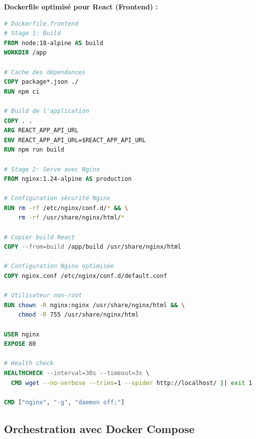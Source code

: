 \begin{exemple}
\textbf{Dockerfile optimisé pour React (Frontend) :}
\begin{lstlisting}[language=dockerfile]
# Dockerfile.frontend
# Stage 1: Build
FROM node:18-alpine AS build
WORKDIR /app

# Cache des dépendances
COPY package*.json ./
RUN npm ci

# Build de l'application
COPY . .
ARG REACT_APP_API_URL
ENV REACT_APP_API_URL=$REACT_APP_API_URL
RUN npm run build

# Stage 2: Serve avec Nginx
FROM nginx:1.24-alpine AS production

# Configuration sécurité Nginx
RUN rm -rf /etc/nginx/conf.d/* && \
    rm -rf /usr/share/nginx/html/*

# Copier build React
COPY --from=build /app/build /usr/share/nginx/html

# Configuration Nginx optimisée
COPY nginx.conf /etc/nginx/conf.d/default.conf

# Utilisateur non-root
RUN chown -R nginx:nginx /usr/share/nginx/html && \
    chmod -R 755 /usr/share/nginx/html

USER nginx
EXPOSE 80

# Health check
HEALTHCHECK --interval=30s --timeout=3s \
  CMD wget --no-verbose --tries=1 --spider http://localhost/ || exit 1

CMD ["nginx", "-g", "daemon off;"]
\end{lstlisting}
\end{exemple}

\subsection{Orchestration avec Docker Compose}

